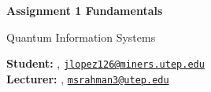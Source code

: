 


\usepackage{physics}
\usepackage{quantikz} %
\usepackage{tikz}
\usetikzlibrary{quantikz2}


\begin{Large}
    \textsf{\textbf{Assignment 1 Fundamentals}}
    
    Quantum Information Systems
\end{Large}

\vspace{1ex}

\textsf{\textbf{Student:}} , \href{mailto:jlopez126@miners.utep.edu}{\texttt{jlopez126@miners.utep.edu}}\\
\textsf{\textbf{Lecturer:}} , \href{mailto:msrahman3@utep.edu}{\texttt{msrahman3@utep.edu}}


\vspace{2ex}



